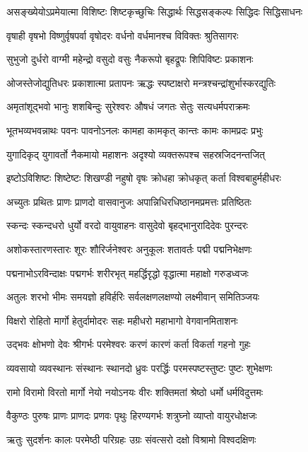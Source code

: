 \twolineshloka
{असङ्ख्येयोऽप्रमेयात्मा विशिष्टः शिष्टकृच्छुचिः}
{सिद्धार्थः सिद्धसङ्कल्पः सिद्धिदः सिद्धिसाधनः}

\twolineshloka
{वृषाही वृषभो विष्णुर्वृषपर्वा वृषोदरः}
{वर्धनो वर्धमानश्च विविक्तः श्रुतिसागरः}

\twolineshloka
{सुभुजो दुर्धरो वाग्मी महेन्द्रो वसुदो वसुः}
{नैकरूपो बृहद्रूपः शिपिविष्टः प्रकाशनः}

\twolineshloka
{ओजस्तेजोद्युतिधरः प्रकाशात्मा प्रतापनः}
{ऋद्धः स्पष्टाक्षरो मन्त्रश्चन्द्रांशुर्भास्करद्युतिः}

\twolineshloka
{अमृतांशूद्भवो भानुः शशबिन्दुः सुरेश्वरः}
{औषधं जगतः सेतुः सत्यधर्मपराक्रमः}

\twolineshloka
{भूतभव्यभवन्नाथः पवनः पावनोऽनलः}
{कामहा कामकृत् कान्तः कामः कामप्रदः प्रभुः}

\twolineshloka
{युगादिकृद् युगावर्तो नैकमायो महाशनः}
{अदृश्यो व्यक्तरूपश्च सहस्रजिदनन्तजित्}

\twolineshloka
{इष्टोऽविशिष्टः शिष्टेष्टः शिखण्डी नहुषो वृषः}
{क्रोधहा क्रोधकृत् कर्ता विश्वबाहुर्महीधरः}

\twolineshloka
{अच्युतः प्रथितः प्राणः प्राणदो वासवानुजः}
{अपान्निधिरधिष्ठानमप्रमत्तः प्रतिष्ठितः}

\twolineshloka
{स्कन्दः स्कन्दधरो धुर्यो वरदो वायुवाहनः}
{वासुदेवो बृहद्भानुरादिदेवः पुरन्दरः}

\twolineshloka
{अशोकस्तारणस्तारः शूरः शौरिर्जनेश्वरः}
{अनुकूलः शतावर्तः पद्मी पद्मनिभेक्षणः}

\twolineshloka
{पद्मनाभोऽरविन्दाक्षः पद्मगर्भः शरीरभृत्}
{महर्द्धिरृद्धो वृद्धात्मा महाक्षो गरुडध्वजः}

\twolineshloka
{अतुलः शरभो भीमः समयज्ञो हविर्हरिः}
{सर्वलक्षणलक्षण्यो लक्ष्मीवान् समितिञ्जयः}

\twolineshloka
{विक्षरो रोहितो मार्गो हेतुर्दामोदरः सहः}
{महीधरो महाभागो वेगवानमिताशनः}

\twolineshloka
{उद्भवः क्षोभणो देवः श्रीगर्भः परमेश्वरः}
{करणं कारणं कर्ता विकर्ता गहनो गुहः}

\twolineshloka
{व्यवसायो व्यवस्थानः संस्थानः स्थानदो ध्रुवः}
{परर्द्धिः परमस्पष्टस्तुष्टः पुष्टः शुभेक्षणः}

\twolineshloka
{रामो विरामो विरतो मार्गो नेयो नयोऽनयः}
{वीरः शक्तिमतां श्रेष्ठो धर्मो धर्मविदुत्तमः}

\twolineshloka
{वैकुण्ठः पुरुषः प्राणः प्राणदः प्रणवः पृथुः}
{हिरण्यगर्भः शत्रुघ्नो व्याप्तो वायुरधोक्षजः}

\twolineshloka
{ऋतुः सुदर्शनः कालः परमेष्ठी परिग्रहः}
{उग्रः संवत्सरो दक्षो विश्रामो विश्वदक्षिणः}

